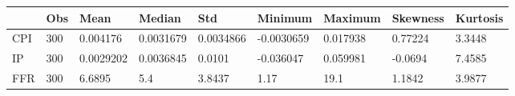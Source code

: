 \begin{tabular}{lllllllll}
\toprule 
& Obs & Mean & Median & Std & Minimum & Maximum & Skewness & Kurtosis \\ 
\midrule 
CPI & 300 & 0.004176 & 0.0031679 & 0.0034866 & -0.0030659 & 0.017938 & 0.77224 & 3.3448 \\ 
IP & 300 & 0.0029202 & 0.0036845 & 0.0101 & -0.036047 & 0.059981 & -0.0694 & 7.4585 \\ 
FFR & 300 & 6.6895 & 5.4 & 3.8437 & 1.17 & 19.1 & 1.1842 & 3.9877 \\ 
\bottomrule 
\end{tabular}